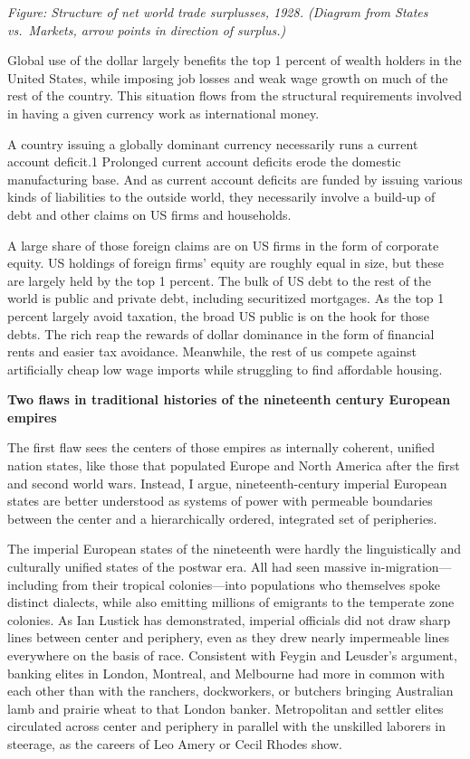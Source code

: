 \documentclass[
]{book}
\begin{document}
\emph{Figure: Structure of net world trade surplusses, 1928. (Diagram from States vs.~Markets, arrow points in direction of surplus.)}

Global use of the dollar largely benefits the top 1 percent of wealth holders in the United States, while imposing job losses and weak wage growth on much of the rest of the country. This situation flows from the structural requirements involved in having a given currency work as international money.

A country issuing a globally dominant currency necessarily runs a current account deficit.1 Prolonged current account deficits erode the domestic manufacturing base. And as current account deficits are funded by issuing various kinds of liabilities to the outside world, they necessarily involve a build-up of debt and other claims on US firms and households.

A large share of those foreign claims are on US firms in the form of corporate equity. US holdings of foreign firms' equity are roughly equal in size, but these are largely held by the top 1 percent. The bulk of US debt to the rest of the world is public and private debt, including securitized mortgages. As the top 1 percent largely avoid taxation, the broad US public is on the hook for those debts. The rich reap the rewards of dollar dominance in the form of financial rents and easier tax avoidance. Meanwhile, the rest of us compete against artificially cheap low wage imports while struggling to find affordable housing.

\textbf{Two flaws in traditional histories of the nineteenth century European empires}

The first flaw sees the centers of those empires as internally coherent, unified nation states, like those that populated Europe and North America after the first and second world wars. Instead, I argue, nineteenth-century imperial European states are better understood as systems of power with permeable boundaries between the center and a hierarchically ordered, integrated set of peripheries.

The imperial European states of the nineteenth were hardly the linguistically and culturally unified states of the postwar era. All had seen massive in-migration---including from their tropical colonies---into populations who themselves spoke distinct dialects, while also emitting millions of emigrants to the temperate zone colonies. As Ian Lustick has demonstrated, imperial officials did not draw sharp lines between center and periphery, even as they drew nearly impermeable lines everywhere on the basis of race. Consistent with Feygin and Leusder's argument, banking elites in London, Montreal, and Melbourne had more in common with each other than with the ranchers, dockworkers, or butchers bringing Australian lamb and prairie wheat to that London banker. Metropolitan and settler elites circulated across center and periphery in parallel with the unskilled laborers in steerage, as the careers of Leo Amery or Cecil Rhodes show.
\end{document}
